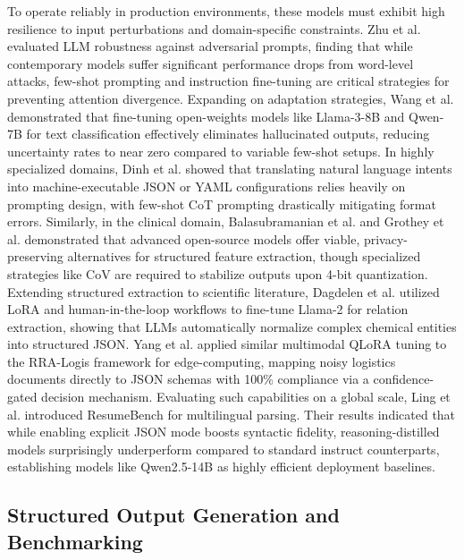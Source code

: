 \documentclass[journal,article,submit,pdftex,moreauthors]{Definitions/mdpi}
\begin{document}
To operate reliably in production environments, these models must exhibit high resilience to input perturbations and domain-specific constraints. Zhu et al. \cite{zhu2023promptrobust} evaluated LLM robustness against adversarial prompts, finding that while contemporary models suffer significant performance drops from word-level attacks, few-shot prompting and instruction fine-tuning are critical strategies for preventing attention divergence. Expanding on adaptation strategies, Wang et al. \cite{wang2024adaptable} demonstrated that fine-tuning open-weights models like Llama-3-8B and Qwen-7B for text classification effectively eliminates hallucinated outputs, reducing uncertainty rates to near zero compared to variable few-shot setups. In highly specialized domains, Dinh et al. \cite{dinh2025towards} showed that translating natural language intents into machine-executable JSON or YAML configurations relies heavily on prompting design, with few-shot CoT prompting drastically mitigating format errors. Similarly, in the clinical domain, Balasubramanian et al. \cite{balasubramanian2025leveraging} and Grothey et al. \cite{grothey2025comprehensive} demonstrated that advanced open-source models offer viable, privacy-preserving alternatives for structured feature extraction, though specialized strategies like CoV are required to stabilize outputs upon 4-bit quantization. Extending structured extraction to scientific literature, Dagdelen et al. \cite{dagdelen2024structured} utilized LoRA and human-in-the-loop workflows to fine-tune Llama-2 for relation extraction, showing that LLMs automatically normalize complex chemical entities into structured JSON. Yang et al. \cite{yang2026research} applied similar multimodal QLoRA tuning to the RRA-Logis framework for edge-computing, mapping noisy logistics documents directly to JSON schemas with 100\% compliance via a confidence-gated decision mechanism. Evaluating such capabilities on a global scale, Ling et al. \cite{ling2025beyond} introduced ResumeBench for multilingual parsing. Their results indicated that while enabling explicit JSON mode boosts syntactic fidelity, reasoning-distilled models surprisingly underperform compared to standard instruct counterparts, establishing models like Qwen2.5-14B as highly efficient deployment baselines.

\subsection{Structured Output Generation and Benchmarking}
\end{document}
